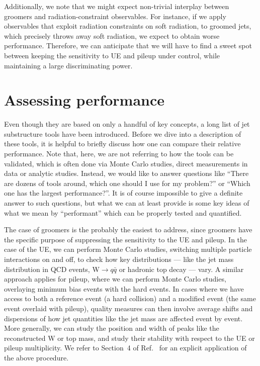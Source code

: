 Additionally, we note that we might expect non-trivial interplay between groomers and radiation-constraint observables.
For instance, if we apply observables that exploit radiation constraints on soft
  radiation, to groomed jets, which precisely throws
  away soft radiation, we expect to obtain worse performance. 
  Therefore, we can anticipate that we will have to find a sweet spot between
  keeping the sensitivity to UE and pileup under control, while
  maintaining a large discriminating power.



\section{Assessing performance}\label{sec:performance-intro}

Even though they are based on only a handful of key concepts, a long
list of jet substructure tools have been introduced. Before we dive
into a description of these tools, it is helpful to briefly discuss
how one can compare their relative performance.
%
Note that, here, we are not referring to how the tools can be
validated, which is often done via Monte Carlo studies, direct
measurements in data or analytic studies. Instead, we would like to answer questions like 
 ``There are dozens of tools around, which one should I
use for my problem?'' or ``Which one has the largest performance?''.
%
It is of course impossible to give a definite answer to such
questions, but what we can at least provide is some key ideas of what
we mean by ``performant'' which can be properly tested and quantified.


The case of groomers is the probably the easiest to address, since
groomers have the specific purpose of suppressing the sensitivity to
the UE and pileup.
%
In the case of the UE, we can perform Monte Carlo studies, switching
multiple particle interactions on and off, to check how key distributions --- like the jet
mass distribution in QCD events, W$\to q\bar q$ or hadronic top decay
--- vary.
%
A similar approach applies for pileup, where we can perform Monte
Carlo studies, overlaying minimum bias events with the hard events.
%
In cases where we have access to both a reference event (\eg a hard
collision) and a modified event (\eg the same event overlaid with
pileup), quality measures can then involve average shifts and
dispersions of how jet quantities like the jet mass are affected event
by event.
%
More generally, we can study the position and width of peaks like the
reconstructed W or top mass, and study their stability with respect to the
UE or pileup multiplicity.
%
We refer to Section~4 of Ref.~\cite{Altheimer:2013yza} for an explicit
application of the above procedure.


